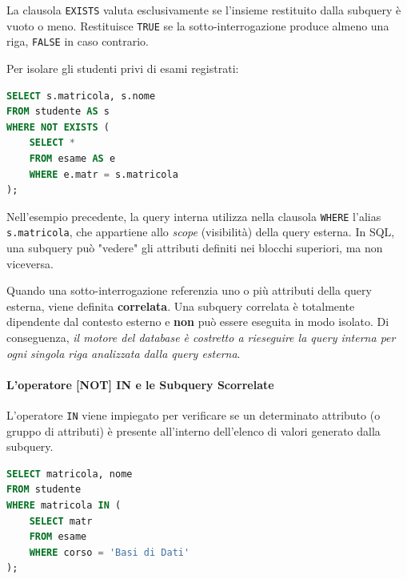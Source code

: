 La clausola \texttt{EXISTS} valuta esclusivamente se l'insieme restituito dalla subquery è vuoto o meno. Restituisce \texttt{TRUE} se la sotto-interrogazione produce almeno una riga, \texttt{FALSE} in caso contrario.

\begin{example}
Per isolare gli studenti privi di esami registrati:
\begin{lstlisting}[language=SQL, basicstyle=\ttfamily\small, keywordstyle=\color{blue}\bfseries]
SELECT s.matricola, s.nome
FROM studente AS s
WHERE NOT EXISTS (
    SELECT *
    FROM esame AS e
    WHERE e.matr = s.matricola
);
\end{lstlisting}
\end{example}

\begin{observation}
Nell'esempio precedente, la query interna utilizza nella clausola \texttt{WHERE} l'alias \texttt{s.matricola}, che appartiene allo \textit{scope} (visibilità) della query esterna. In SQL, una subquery può "vedere" gli attributi definiti nei blocchi superiori, ma non viceversa.

Quando una sotto-interrogazione referenzia uno o più attributi della query esterna, viene definita \textbf{correlata}. Una subquery correlata è totalmente dipendente dal contesto esterno e \textbf{non} può essere eseguita in modo isolato. Di conseguenza, \textit{il motore del database è costretto a rieseguire la query interna per ogni singola riga analizzata dalla query esterna}.
\end{observation}

\paragraph{L'operatore [NOT] IN e le Subquery Scorrelate}

L'operatore \texttt{IN} viene impiegato per verificare se un determinato attributo (o gruppo di attributi) è presente all'interno dell'elenco di valori generato dalla subquery.

\medskip

\begin{example}
\begin{lstlisting}[language=SQL, basicstyle=\ttfamily\small, keywordstyle=\color{blue}\bfseries]
SELECT matricola, nome
FROM studente
WHERE matricola IN (
    SELECT matr
    FROM esame
    WHERE corso = 'Basi di Dati'
);
\end{lstlisting}
\end{example}

